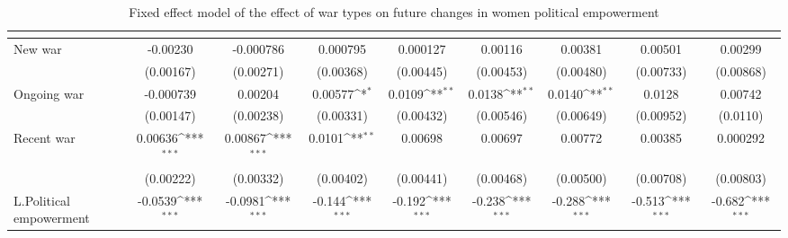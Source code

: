 \begin{table}[htbp]\centering
\def\sym#1{\ifmmode^{#1}\else\(^{#1}\)\fi}
\caption{Fixed effect model of the effect of war types on future changes in women political empowerment\label{tab3}}
\begin{tabular}{l*{8}{c}}
\hline\hline
                    &&&&&&&&\\
\hline
New war             &    -0.00230         &   -0.000786         &    0.000795         &    0.000127         &     0.00116         &     0.00381         &     0.00501         &     0.00299         \\
                    &   (0.00167)         &   (0.00271)         &   (0.00368)         &   (0.00445)         &   (0.00453)         &   (0.00480)         &   (0.00733)         &   (0.00868)         \\
[1em]
Ongoing war         &   -0.000739         &     0.00204         &     0.00577\sym{*}  &      0.0109\sym{**} &      0.0138\sym{**} &      0.0140\sym{**} &      0.0128         &     0.00742         \\
                    &   (0.00147)         &   (0.00238)         &   (0.00331)         &   (0.00432)         &   (0.00546)         &   (0.00649)         &   (0.00952)         &    (0.0110)         \\
[1em]
Recent war          &     0.00636\sym{***}&     0.00867\sym{***}&      0.0101\sym{**} &     0.00698         &     0.00697         &     0.00772         &     0.00385         &    0.000292         \\
                    &   (0.00222)         &   (0.00332)         &   (0.00402)         &   (0.00441)         &   (0.00468)         &   (0.00500)         &   (0.00708)         &   (0.00803)         \\
[1em]
L.Political empowerment&     -0.0539\sym{***}&     -0.0981\sym{***}&      -0.144\sym{***}&      -0.192\sym{***}&      -0.238\sym{***}&      -0.288\sym{***}&      -0.513\sym{***}&      -0.682\sym{***}\\

\end{tabular}
\end{table}
